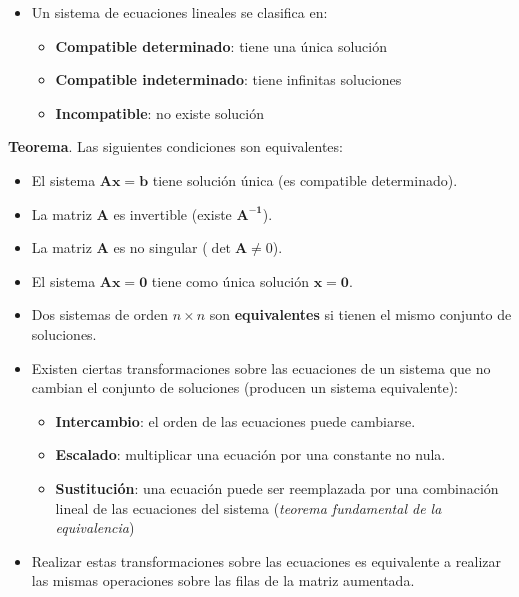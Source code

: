 \documentclass[openany]{book}
\providecommand{\tightlist}{%
  \setlength{\itemsep}{0pt}\setlength{\parskip}{0pt}}
\begin{document}
\begin{itemize}
\item
  Un sistema de ecuaciones lineales se clasifica en:

  \begin{itemize}
  \tightlist
  \item
    \textbf{Compatible determinado}: tiene una única solución
  \item
    \textbf{Compatible indeterminado}: tiene infinitas soluciones
  \item
    \textbf{Incompatible}: no existe solución
  \end{itemize}
\end{itemize}

\textbf{Teorema}. Las siguientes condiciones son equivalentes:

\begin{itemize}
\item
  El sistema \(\mathbf{Ax=b}\) tiene solución única (es compatible determinado).
\item
  La matriz \(\mathbf{A}\) es invertible (existe \(\mathbf{A^{-1}}\)).
\item
  La matriz \(\mathbf{A}\) es no singular (\(\det \mathbf{A} \neq 0\)).
\item
  El sistema \(\mathbf{Ax=0}\) tiene como única solución \(\mathbf{x=0}\).
\item
  Dos sistemas de orden \(n \times n\) son \textbf{equivalentes} si tienen el mismo conjunto de soluciones.
\item
  Existen ciertas transformaciones sobre las ecuaciones de un sistema que no cambian el conjunto de soluciones (producen un sistema equivalente):

  \begin{itemize}
  \tightlist
  \item
    \textbf{Intercambio}: el orden de las ecuaciones puede cambiarse.
  \item
    \textbf{Escalado}: multiplicar una ecuación por una constante no nula.
  \item
    \textbf{Sustitución}: una ecuación puede ser reemplazada por una combinación lineal de las ecuaciones del sistema (\emph{teorema fundamental de la equivalencia})
  \end{itemize}
\item
  Realizar estas transformaciones sobre las ecuaciones es equivalente a realizar las mismas operaciones sobre las filas de la matriz aumentada.
\end{itemize}
\end{document}
